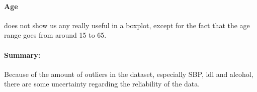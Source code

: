 \paragraph{Age} does not show us any really useful in a boxplot, except for the fact that the age range goes from around 15 to 65.

\paragraph{Summary:} Because of the amount of outliers in the dataset, especially SBP, ldl and alcohol, there are some uncertainty regarding the reliability of the data.

